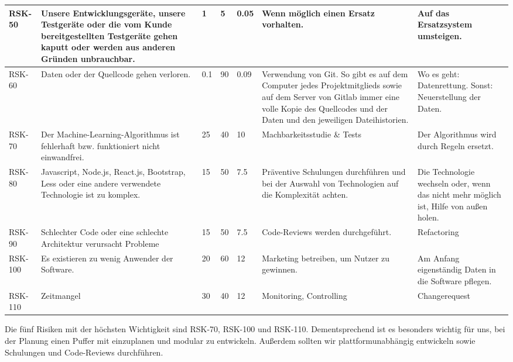 \begin{landscape}
\begin{longtable}{|p{1.5cm}|p{4.5cm}|p{0.4cm}|p{0.4cm}|p{0.8cm}|p{4.5cm}|p{4.5cm}|}
		\\ \hline 

		RSK-50 	& Unsere Entwicklungsgeräte, unsere Testgeräte oder die vom Kunde bereitgestellten Testgeräte gehen kaputt oder werden aus anderen Gründen unbrauchbar.
				& 1 	& 5 	& 0.05 	& Wenn möglich einen Ersatz vorhalten.
								& Auf das Ersatzsystem umsteigen.

		\\ \hline

		RSK-60 	& Daten oder der Quellcode gehen verloren.
				& 0.1 	& 90 	& 0.09 	& Verwendung von Git. So gibt es auf dem Computer jedes Projektmitglieds sowie auf dem Server von Gitlab immer eine volle Kopie des Quellcodes und der Daten und den jeweiligen Dateihistorien.
								& Wo es geht: Datenrettung. Sonst: Neuerstellung der Daten.

		\\ \hline 

		

		RSK-70	& Der Machine-Learning-Algorithmus ist fehlerhaft bzw. funktioniert nicht einwandfrei.
				& 25 	& 40 &	10 	& Machbarkeitsstudie \& Tests
								& Der Algorithmus wird durch Regeln ersetzt.

		\\ \hline

		RSK-80	& Javascript, Node.js, React.js, Bootstrap, Less oder eine andere verwendete Technologie ist zu komplex.
				& 15 	& 50 	& 7.5 	& Präventive Schulungen durchführen und bei der Auswahl von Technologien auf die Komplexität achten. 
								& Die Technologie wechseln oder, wenn das nicht mehr möglich ist, Hilfe von außen holen.

		\\ \hline

		RSK-90	& Schlechter Code oder eine schlechte Architektur verursacht Probleme
				& 15 	& 50 	& 7.5 	& Code-Reviews werden durchgeführt.
								& Refactoring

		\\ \hline
		
		RSK-100	& Es existieren zu wenig Anwender der Software.
				& 20 	& 60 	& 12 	& Marketing betreiben, um Nutzer zu gewinnen.
								& Am Anfang eigenständig Daten in die Software pflegen.

		\\ \hline
		RSK-110 & Zeitmangel  & 30 & 40 & 12&  Monitoring, Controlling & Changerequest 
		\\ \hline

	\end{longtable}

	Die fünf Risiken mit der höchsten Wichtigkeit sind RSK-70, RSK-100 und RSK-110. Dementsprechend ist es besonders wichtig für uns, bei der Planung einen Puffer mit einzuplanen und modular zu entwickeln. Außerdem sollten wir plattformunabhängig entwickeln sowie Schulungen und Code-Reviews durchführen. 
	
\end{landscape}
